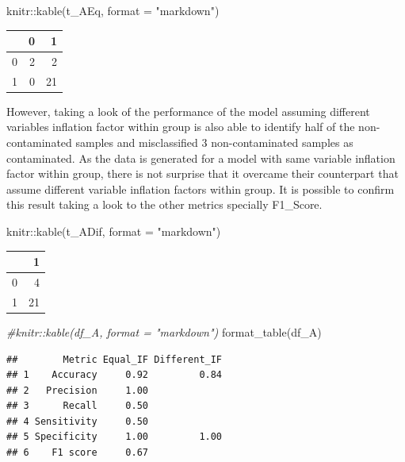 \documentclass[
]{article}
\newenvironment{Shaded}{\begin{snugshade}}{\end{snugshade}}
\newcommand{\AttributeTok}[1]{\textcolor[rgb]{0.77,0.63,0.00}{#1}}
\newcommand{\CommentTok}[1]{\textcolor[rgb]{0.56,0.35,0.01}{\textit{#1}}}
\newcommand{\FunctionTok}[1]{\textcolor[rgb]{0.00,0.00,0.00}{#1}}
\newcommand{\NormalTok}[1]{#1}
\newcommand{\SpecialCharTok}[1]{\textcolor[rgb]{0.00,0.00,0.00}{#1}}
\newcommand{\StringTok}[1]{\textcolor[rgb]{0.31,0.60,0.02}{#1}}
\begin{document}
\begin{Shaded}
\begin{Highlighting}[]
\NormalTok{knitr}\SpecialCharTok{::}\FunctionTok{kable}\NormalTok{(t\_AEq, }\AttributeTok{format =} \StringTok{"markdown"}\NormalTok{)}
\end{Highlighting}
\end{Shaded}

\begin{longtable}[]{@{}lrr@{}}
\toprule()
& 0 & 1 \\
\midrule()
\endhead
0 & 2 & 2 \\
1 & 0 & 21 \\
\bottomrule()
\end{longtable}

However, taking a look of the performance of the model assuming
different variables inflation factor within group is also able to
identify half of the non-contaminated samples and misclassified \(3\)
non-contaminated samples as contaminated. As the data is generated for a
model with same variable inflation factor within group, there is not
surprise that it overcame their counterpart that assume different
variable inflation factors within group. It is possible to confirm this
result taking a look to the other metrics specially F1\_Score.

\begin{Shaded}
\begin{Highlighting}[]
\NormalTok{knitr}\SpecialCharTok{::}\FunctionTok{kable}\NormalTok{(t\_ADif, }\AttributeTok{format =} \StringTok{"markdown"}\NormalTok{)}
\end{Highlighting}
\end{Shaded}

\begin{longtable}[]{@{}lr@{}}
\toprule()
& 1 \\
\midrule()
\endhead
0 & 4 \\
1 & 21 \\
\bottomrule()
\end{longtable}

\begin{Shaded}
\begin{Highlighting}[]
\CommentTok{\#knitr::kable(df\_A, format = "markdown")}
\FunctionTok{format\_table}\NormalTok{(df\_A)}
\end{Highlighting}
\end{Shaded}

\begin{verbatim}
##        Metric Equal_IF Different_IF
## 1    Accuracy     0.92         0.84
## 2   Precision     1.00             
## 3      Recall     0.50             
## 4 Sensitivity     0.50             
## 5 Specificity     1.00         1.00
## 6    F1 score     0.67
\end{verbatim}
\end{document}
